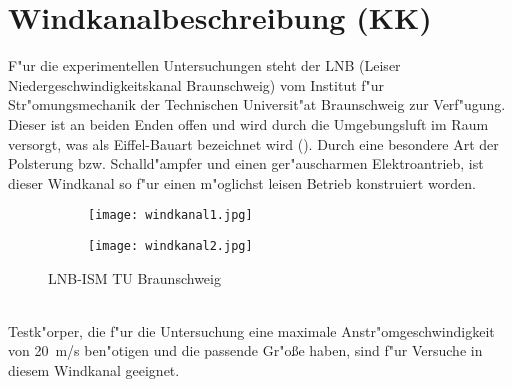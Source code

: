 \clearpage




\section{Windkanalbeschreibung (KK)}
F"ur die experimentellen Untersuchungen steht der LNB (Leiser Niedergeschwindigkeitskanal Braunschweig) vom Institut f"ur Str"omungsmechanik der Technischen  Universit"at Braunschweig zur Verf"ugung.\\
Dieser ist an beiden Enden offen und wird durch die Umgebungsluft im Raum versorgt, was als Eiffel-Bauart bezeichnet wird ().
Durch eine besondere Art der Polsterung bzw. Schalld"ampfer und einen
ger"auscharmen Elektroantrieb, ist dieser Windkanal so f"ur einen m"oglichst leisen Betrieb konstruiert worden.
\begin{figure}[h]
	\centering
	\begin{subfigure}[c]{0.6\textwidth}		
		\texttt{[image: windkanal1.jpg]}
	\end{subfigure}
	\begin{subfigure}[c]{0.6\textwidth}
		\texttt{[image: windkanal2.jpg]}
	\end{subfigure}
	\caption{LNB-ISM TU Braunschweig}
	\label{fig:windkanal}
\end{figure}\\
Testk"orper, die f"ur die Untersuchung eine maximale Anstr"omgeschwindigkeit von \SI{20}{\meter/\second} ben"otigen und die passende Gr"o\ss{}e haben, sind f"ur Versuche in diesem Windkanal geeignet.

